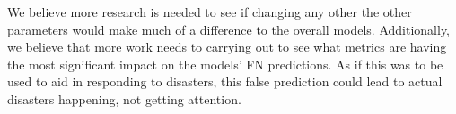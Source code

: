\documentclass[a4paper,10pt]{article}
\begin{document}
	We believe more research is needed to see if changing any other the other parameters would make much of a difference to the overall models. Additionally, we believe that more work needs to carrying out to see what metrics are having the most significant impact on the models' FN predictions. As if this was to be used to aid in responding to disasters, this false prediction could lead to actual disasters happening, not getting attention.
	
\medskip
\newpage
	
	




\end{document}
